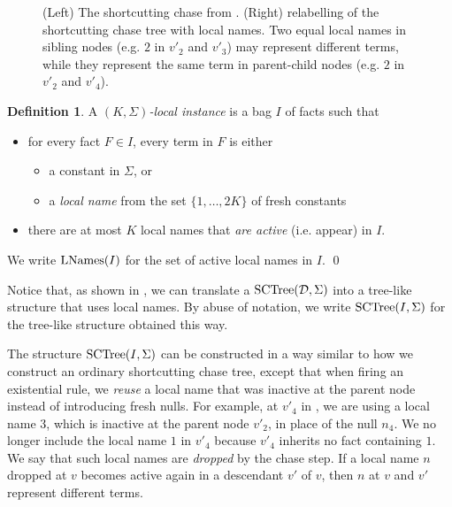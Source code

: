 \documentclass[12pt]{report}
\theoremstyle{plain}
\theoremstyle{definition}
\newtheorem{definition}[theorem]{Definition}
\newcommand{\SCTree}[2]{\ensuremath{\normalfont{\textrm{SCTree}}\!\left( #1, #2 \right)}}
\newcommand{\LNames}[1]{\ensuremath{\normalfont{\textrm{LNames}}\!\left( #1 \right)}}
\begin{document}
\begin{figure}[ht]
  \centering
  
  \caption{(Left) The shortcutting chase from . (Right) relabelling of the shortcutting chase tree with local names. Two equal local names in sibling nodes (e.g. $2$ in $v'_2$ and $v'_3$) may represent different terms, while they represent the same term in parent-child nodes (e.g. $2$ in $v'_2$ and $v'_4$).}
  \label{figure:sctree-simple-example-local-names}
\end{figure}

\begin{definition}
  A \emph{$(K, \Sigma)$-local instance} is a bag $I$ of facts such that
  \begin{itemize}
    \item for every fact $F \in I$, every term in $F$ is either
    \begin{itemize}
      \item a constant in $\Sigma$, or
      \item a \emph{local name} from the set $\{ 1, \ldots, 2K \}$ of fresh constants
    \end{itemize}
    \item there are at most $K$ local names that \emph{are active} (i.e. appear) in $I$.
  \end{itemize}

  We write $\LNames{I}$ for the set of active local names in $I$.
  \qed
\end{definition}

Notice that, as shown in , we can translate a $\SCTree{\mathcal{D}}{\Sigma}$ into a tree-like structure that uses local names. By abuse of notation, we write $\SCTree{I}{\Sigma}$ for the tree-like structure obtained this way.

The structure $\SCTree{I}{\Sigma}$ can be constructed in a way similar to how we construct an ordinary shortcutting chase tree, except that when firing an existential rule, we \emph{reuse} a local name that was inactive at the parent node instead of introducing fresh nulls. For example, at $v'_4$ in , we are using a local name $3$, which is inactive at the parent node $v'_2$, in place of the null $n_4$. We no longer include the local name $1$ in $v'_4$ because $v'_4$ inherits no fact containing $1$. We say that such local names are \emph{dropped} by the chase step. If a local name $n$ dropped at $v$ becomes active again in a descendant $v'$ of $v$, then $n$ at $v$ and $v'$ represent different terms.
\end{document}
